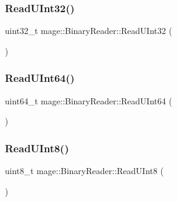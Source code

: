 \hypertarget{classmage_1_1_binary_reader_a4decb312a91e30406b82178268053f53}{}\label{classmage_1_1_binary_reader_a4decb312a91e30406b82178268053f53} 
\subsubsection{\texorpdfstring{Read\+U\+Int32()}{ReadUInt32()}}
{\footnotesize\ttfamily uint32\+\_\+t mage\+::\+Binary\+Reader\+::\+Read\+U\+Int32 (\begin{DoxyParamCaption}{ }\end{DoxyParamCaption})\hspace{0.3cm}{\ttfamily [protected]}}

\hypertarget{classmage_1_1_binary_reader_a480f2bd7320beed37a71b8122c8550bd}{}\label{classmage_1_1_binary_reader_a480f2bd7320beed37a71b8122c8550bd} 
\subsubsection{\texorpdfstring{Read\+U\+Int64()}{ReadUInt64()}}
{\footnotesize\ttfamily uint64\+\_\+t mage\+::\+Binary\+Reader\+::\+Read\+U\+Int64 (\begin{DoxyParamCaption}{ }\end{DoxyParamCaption})\hspace{0.3cm}{\ttfamily [protected]}}

\hypertarget{classmage_1_1_binary_reader_af0378b53d82b20ec703e09b325d7a5d2}{}\label{classmage_1_1_binary_reader_af0378b53d82b20ec703e09b325d7a5d2} 
\subsubsection{\texorpdfstring{Read\+U\+Int8()}{ReadUInt8()}}
{\footnotesize\ttfamily uint8\+\_\+t mage\+::\+Binary\+Reader\+::\+Read\+U\+Int8 (\begin{DoxyParamCaption}{ }\end{DoxyParamCaption})\hspace{0.3cm}{\ttfamily [protected]}}



